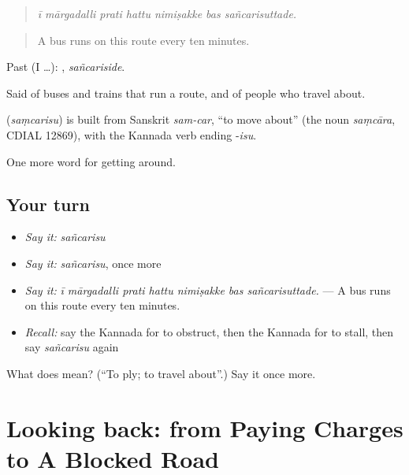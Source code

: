\begin{quote}
\emph{ī mārgadalli prati hattu nimiṣakke bas sañcarisuttade.}
\end{quote}

\begin{quote}
A bus runs on this route every ten minutes.
\end{quote}

Past (I …): , \emph{sañcariside}.

Said of buses and trains that run a route, and of people who travel about.

\begin{cousinweb}
\textbf{} (\emph{saṃcarisu}) is built from Sanskrit \emph{sam-car}, \textquotedblleft{}to move about\textquotedblright{} (the noun \emph{saṃcāra}, CDIAL 12869), with the Kannada verb ending -\emph{isu}.
\end{cousinweb}

\begin{grammarlens}[title={What you've built}]
One more word for getting around.
\end{grammarlens}

\subsection*{Your turn}
\begin{itemize}
\raggedright
  \item \emph{Say it:} \emph{sañcarisu}
  \item \emph{Say it:} \emph{sañcarisu}, once more
  \item \emph{Say it:} \emph{ī mārgadalli prati hattu nimiṣakke bas sañcarisuttade.} — A bus runs on this route every ten minutes.
  \item \emph{Recall:} say the Kannada for to obstruct, then the Kannada for to stall, then say \emph{sañcarisu} again
\end{itemize}

\begin{tcolorbox}[breakable,colback=teal!4,colframe=teal!35!black,title={Before you move on}]
What does  mean? (\textquotedblleft{}To ply; to travel about\textquotedblright{}.) Say it once more.
\end{tcolorbox}
\section[(dialogue)]{Looking back: from Paying Charges to A Blocked Road}

